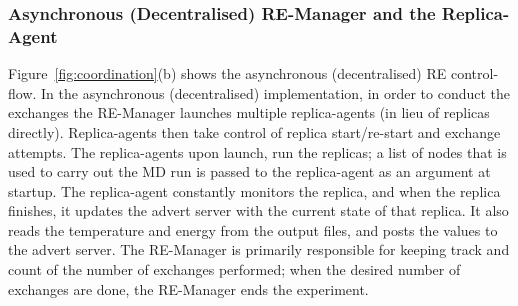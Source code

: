 \documentclass{rspublic}
\newcommand{\jhanote}[1]{ {\textcolor{red} { ***shantenu: #1 }}}
\newcommand{\alnote}[1]{ {\textcolor{blue} { ***andre: #1 }}}
\newcommand{\alnote}[1]{}
\newcommand{\jhanote}[1]{}
\begin{document}

\subsubsection{Asynchronous (Decentralised) RE-Manager and the Replica-Agent}

 

Figure~\ref{fig:coordination}(b) shows the asynchronous
(decentralised) RE control-flow.  In the asyn\-chron\-ous (decentralised)
implementation, in order to conduct the exchanges the RE-Manager
launches multiple replica-agents (in lieu of replicas directly).
Replica-agents then take control of replica start/re-start and
exchange attempts.  The replica-agents upon launch, run the replicas;
a list of nodes that is used to carry out the MD run is passed to the
replica-agent as an argument at startup.  The replica-agent constantly
monitors the replica, and when the replica finishes, it updates the
advert server with the current state of that replica.  It also reads
the temperature and energy from the output files, and posts the values
to the advert server.  The RE-Manager is primarily responsible for
keeping track and count of the number of exchanges performed; when the
desired number of exchanges are done, the RE-Manager ends the
experiment.

  
\end{document}
